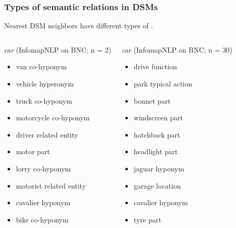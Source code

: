 \documentclass[t]{beamer} %
\begin{document}
\begin{frame}
\frametitle{Types of semantic relations in DSMs}

Nearest DSM neighbors have different types of .

\footnotesize
 \begin{columns}[t]
    \begin{block}{\emph{car} {\small (InfomapNLP on BNC; n = 2)}}
      \begin{itemize}
      \item  van {\color{counterpoint} co-hyponym}
      \item vehicle {\color{counterpoint} hyperonym}
      \item truck {\color{counterpoint} co-hyponym}
      \item motorcycle {\color{counterpoint} co-hyponym}
      \item driver {\color{counterpoint} related entity}
      \item motor {\color{counterpoint} part}
      \item lorry {\color{counterpoint} co-hyponym}
      \item motorist {\color{counterpoint} related entity}
      \item cavalier {\color{counterpoint} hyponym}
      \item bike {\color{counterpoint} co-hyponym}
\end{itemize}
\end{block}
\begin{block} {\emph{car} {\small (InfomapNLP on BNC; n = 30)}}
  \begin{itemize}
  \item drive {\color{counterpoint} function}
  \item park {\color{counterpoint} typical action}
  \item bonnet {\color{counterpoint} part}
  \item windscreen {\color{counterpoint} part}
  \item hatchback {\color{counterpoint} part}
\item headlight {\color{counterpoint} part}
\item jaguar {\color{counterpoint} hyponym}
\item garage {\color{counterpoint} location}
\item cavalier {\color{counterpoint} hyponym}
\item tyre {\color{counterpoint} part}
\end{itemize}
\end{block}
  \end{columns}

\end{frame}
\end{document}
